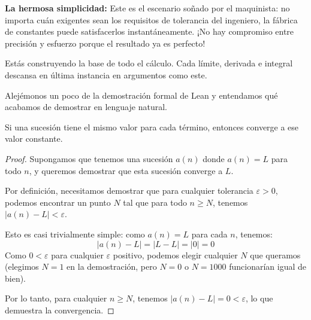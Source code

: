 \textbf{La hermosa simplicidad:} Este es el escenario soñado por el
maquinista: no importa cuán exigentes sean los requisitos de tolerancia
del ingeniero, la fábrica de constantes puede satisfacerlos
instantáneamente. ¡No hay compromiso entre precisión y esfuerzo porque
el resultado ya es perfecto!

Estás construyendo la base de todo el cálculo. Cada límite, derivada e
integral descansa en última instancia en argumentos como este.


Alejémonos un poco de la demostración formal de Lean y entendamos qué
acabamos de demostrar en lenguaje natural.

\begin{theorem}
  Si una sucesión tiene el mismo valor para cada término, entonces
  converge a ese valor constante.
\end{theorem}

\begin{proof}
  Supongamos que tenemos una sucesión $a(n)$ donde $a(n) = L$ para todo
  $n$, y queremos demostrar que esta sucesión converge a $L$.

  Por definición, necesitamos demostrar que para cualquier tolerancia
  $\varepsilon > 0$, podemos encontrar un punto $N$ tal que para todo
  $n \geq N$, tenemos $|a(n) - L| < \varepsilon$.

  Esto es casi trivialmente simple: como $a(n) = L$ para cada $n$,
  tenemos:
  \[ |a(n) - L| = |L - L| = |0| = 0 \]
  Como $0 < \varepsilon$ para cualquier $\varepsilon$ positivo, podemos elegir cualquier
  $N$ que queramos (elegimos $N = 1$ en la demostración, pero $N = 0$ o
  $N = 1000$ funcionarían igual de bien).

  Por lo tanto, para cualquier $n \geq N$, tenemos
  $|a(n) - L| = 0 < \varepsilon$, lo que demuestra la convergencia.
\end{proof}


